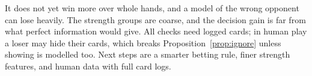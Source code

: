 \documentclass[11pt,a4paper]{article}
\begin{document}
It does not yet win more over whole hands, and a model of the wrong opponent
can lose heavily. The strength groups are coarse, and the decision gain is far
from what perfect information would give. All checks need logged cards; in
human play a loser may hide their cards, which breaks
Proposition~\ref{prop:ignore} unless showing is modelled too. Next steps are a
smarter betting rule, finer strength features, and human data with full card
logs.



\end{document}
